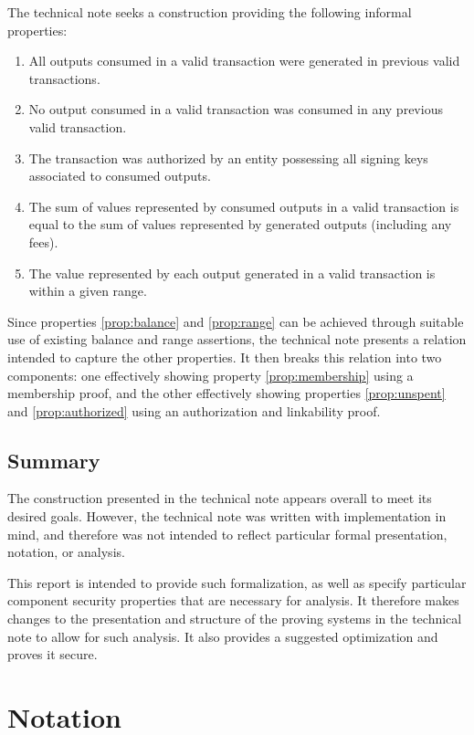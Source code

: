 \documentclass{article}
\theoremstyle{definition}
\begin{document}
The technical note seeks a construction providing the following informal properties:
\begin{enumerate}
	\item \label{prop:membership} All outputs consumed in a valid transaction were generated in previous valid transactions.
	\item \label{prop:unspent} No output consumed in a valid transaction was consumed in any previous valid transaction.
	\item \label{prop:authorized} The transaction was authorized by an entity possessing all signing keys associated to consumed outputs.
	\item \label{prop:balance} The sum of values represented by consumed outputs in a valid transaction is equal to the sum of values represented by generated outputs (including any fees).
	\item \label{prop:range} The value represented by each output generated in a valid transaction is within a given range.
\end{enumerate}
Since properties \ref{prop:balance} and \ref{prop:range} can be achieved through suitable use of existing balance and range assertions, the technical note presents a relation intended to capture the other properties.
It then breaks this relation into two components: one effectively showing property \ref{prop:membership} using a membership proof, and the other effectively showing properties \ref{prop:unspent} and \ref{prop:authorized} using an authorization and linkability proof.


\subsection{Summary}

The construction presented in the technical note appears overall to meet its desired goals.
However, the technical note was written with implementation in mind, and therefore was not intended to reflect particular formal presentation, notation, or analysis.

This report is intended to provide such formalization, as well as specify particular component security properties that are necessary for analysis.
It therefore makes changes to the presentation and structure of the proving systems in the technical note to allow for such analysis.
It also provides a suggested optimization and proves it secure.


\section{Notation}
\end{document}
